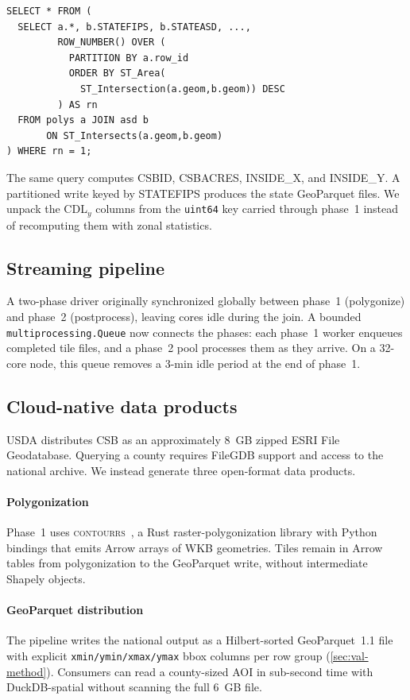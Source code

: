 \documentclass[preprint,12pt]{elsarticle}
\begin{document}
\begin{verbatim}
SELECT * FROM (
  SELECT a.*, b.STATEFIPS, b.STATEASD, ...,
         ROW_NUMBER() OVER (
           PARTITION BY a.row_id
           ORDER BY ST_Area(
             ST_Intersection(a.geom,b.geom)) DESC
         ) AS rn
  FROM polys a JOIN asd b
       ON ST_Intersects(a.geom,b.geom)
) WHERE rn = 1;
\end{verbatim}

The same query computes CSBID, CSBACRES, INSIDE\_X, and INSIDE\_Y. A
partitioned write keyed by STATEFIPS produces the state GeoParquet files. We
unpack the CDL$_y$ columns from the \texttt{uint64} key carried through
phase~1 instead of recomputing them with zonal statistics.

\subsection{Streaming pipeline}
\label{sec:method-streaming}

A two-phase driver originally synchronized globally between phase~1
(polygonize) and phase~2 (postprocess), leaving cores idle during the join. A
bounded \texttt{multiprocessing.Queue} now connects the phases: each phase~1
worker enqueues completed tile files, and a phase~2 pool processes them as
they arrive. On a 32-core node, this queue removes a 3-min idle period at the
end of phase~1.

\subsection{Cloud-native data products}
\label{sec:method-cloud}

USDA distributes CSB as an approximately 8~GB zipped ESRI File Geodatabase.
Querying a county requires FileGDB support and access to the national archive.
We instead generate three open-format data products.

\paragraph{Polygonization} Phase~1 uses \textsc{contourrs}~\cite{contourrs}, a
Rust raster-polygonization library with Python bindings that emits Arrow
arrays of WKB geometries. Tiles remain in Arrow tables from polygonization to
the GeoParquet write, without intermediate Shapely objects.

\paragraph{GeoParquet distribution} The pipeline writes the national output
as a Hilbert-sorted GeoParquet~1.1 file with explicit
\texttt{xmin/ymin/xmax/ymax} bbox columns per row group
(\cref{sec:val-method}). Consumers can read a county-sized AOI in
sub-second time with DuckDB-spatial without scanning the full 6~GB file.
\end{document}
